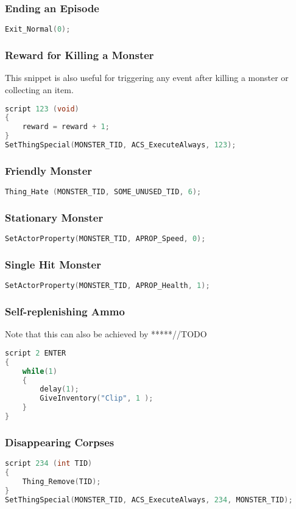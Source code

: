 		\subsubsection*{Ending an Episode}

			\begin{lstlisting}[language=C++]
Exit_Normal(0);
			\end{lstlisting}
		\subsubsection*{Reward for Killing a Monster} This snippet is also useful for triggering any event after killing a monster or collecting an item.
			\begin{lstlisting}[language=C++]
script 123 (void)
{
	reward = reward + 1;
}
SetThingSpecial(MONSTER_TID, ACS_ExecuteAlways, 123);
			\end{lstlisting}
\subsubsection*{Friendly Monster}
			\begin{lstlisting}[language=C++]
Thing_Hate (MONSTER_TID, SOME_UNUSED_TID, 6);
			\end{lstlisting}
		\subsubsection*{Stationary Monster}
			\begin{lstlisting}[language=C++]
SetActorProperty(MONSTER_TID, APROP_Speed, 0);
			\end{lstlisting}
		\subsubsection*{Single Hit Monster}
			\begin{lstlisting}[language=C++]
SetActorProperty(MONSTER_TID, APROP_Health, 1);
			\end{lstlisting}
		\subsubsection*{Self-replenishing Ammo}
		Note that this can also be achieved by  *****//TODO
			\begin{lstlisting}[language=C++]
script 2 ENTER
{   
    while(1)
    {
        delay(1);
        GiveInventory("Clip", 1 );
    }
}

			\end{lstlisting}
		\subsubsection*{Disappearing Corpses}
			\begin{lstlisting}[language=C++]
script 234 (int TID)
{
	Thing_Remove(TID);
}
SetThingSpecial(MONSTER_TID, ACS_ExecuteAlways, 234, MONSTER_TID);
			\end{lstlisting}